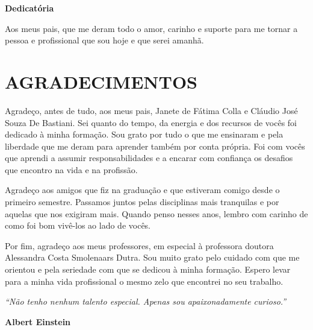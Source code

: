 
\clearpage
\noindent\textbf{Dedicatória}\par
\vfill
\noindent\hfill\begin{minipage}{.36\textwidth}
\raggedleft
Aos meus pais, que me deram todo o amor, carinho e suporte para me tornar a pessoa e profissional que sou hoje e que serei amanhã.\par
\end{minipage}\par
\chapter*{AGRADECIMENTOS}

Agradeço, antes de tudo, aos meus pais, Janete de Fátima Colla e Cláudio José Souza De Bastiani. Sei quanto do tempo, da energia e dos recursos de vocês foi dedicado à minha formação. Sou grato por tudo o que me ensinaram e pela liberdade que me deram para aprender também por conta própria. Foi com vocês que aprendi a assumir responsabilidades e a encarar com confiança os desafios que encontro na vida e na profissão.

Agradeço aos amigos que fiz na graduação e que estiveram comigo desde o primeiro semestre. Passamos juntos pelas disciplinas mais tranquilas e por aquelas que nos exigiram mais. Quando penso nesses anos, lembro com carinho de como foi bom vivê-los ao lado de vocês.

Por fim, agradeço aos meus professores, em especial à professora doutora Alessandra Costa Smolenaars Dutra. Sou muito grato pelo cuidado com que me orientou e pela seriedade com que se dedicou à minha formação. Espero levar para a minha vida profissional o mesmo zelo que encontrei no seu trabalho.
\clearpage
\vspace*{\fill}
\noindent\hfill\begin{minipage}{.36\textwidth}
\raggedleft
\textit{“Não tenho nenhum talento especial. Apenas sou apaixonadamente curioso.”}\par
\medskip
\textbf{Albert Einstein}\par
\end{minipage}\par
